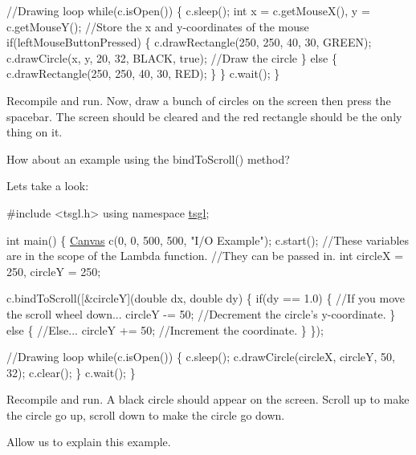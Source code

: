 \begin{DoxyCode}
  \textcolor{comment}{//Drawing loop}
  \textcolor{keywordflow}{while}(c.isOpen()) \{
    c.sleep();
    \textcolor{keywordtype}{int} x = c.getMouseX(), y = c.getMouseY();  \textcolor{comment}{//Store the x and y-coordinates of the mouse}
    \textcolor{keywordflow}{if}(leftMouseButtonPressed) \{
      c.drawRectangle(250, 250, 40, 30, GREEN);
      c.drawCircle(x, y, 20, 32, BLACK, \textcolor{keyword}{true});  \textcolor{comment}{//Draw the circle}
    \} \textcolor{keywordflow}{else} \{
      c.drawRectangle(250, 250, 40, 30, RED);
    \}
  \}
  c.wait();
\}
\end{DoxyCode}


Recompile and run. Now, draw a bunch of circles on the screen then press the spacebar. The screen should be cleared and the red rectangle should be the only thing on it.

How about an example using the bind\+To\+Scroll() method?

Let\textquotesingle{}s take a look\+:


\begin{DoxyCode}
\textcolor{preprocessor}{#include <tsgl.h>}
\textcolor{keyword}{using namespace }\hyperlink{namespacetsgl}{tsgl};

\textcolor{keywordtype}{int} main() \{
  \hyperlink{classtsgl_1_1_canvas}{Canvas} c(0, 0, 500, 500, \textcolor{stringliteral}{"I/O Example"});
  c.start();
  \textcolor{comment}{//These variables are in the scope of the Lambda function.}
  \textcolor{comment}{//They can be passed in.}
  \textcolor{keywordtype}{int} circleX = 250, circleY = 250;

  c.bindToScroll([&circleY](\textcolor{keywordtype}{double} dx, \textcolor{keywordtype}{double} dy) \{
    \textcolor{keywordflow}{if}(dy == 1.0) \{ \textcolor{comment}{//If you move the scroll wheel down...}
      circleY -= 50;  \textcolor{comment}{//Decrement the circle's y-coordinate.}
    \} \textcolor{keywordflow}{else} \{ \textcolor{comment}{//Else...}
      circleY += 50;  \textcolor{comment}{//Increment the coordinate.}
    \}
  \});

  \textcolor{comment}{//Drawing loop}
  \textcolor{keywordflow}{while}(c.isOpen()) \{
    c.sleep();
    c.drawCircle(circleX, circleY, 50, 32);
    c.clear();
  \}
  c.wait();
\}
\end{DoxyCode}


Recompile and run. A black circle should appear on the screen. Scroll up to make the circle go up, scroll down to make the circle go down.

Allow us to explain this example.

